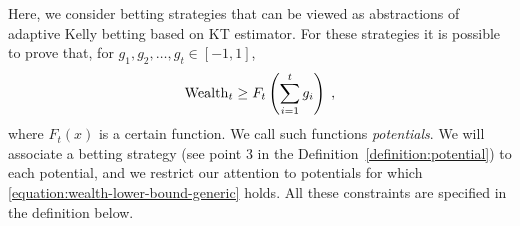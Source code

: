 Here, we consider betting strategies that can be viewed as abstractions of
adaptive Kelly betting based on KT estimator. For these strategies it is
possible to prove that, for $g_1, g_2, \dots, g_t \in [-1,1]$,
\begin{equation}
\label{equation:wealth-lower-bound-generic}
\operatorname{Wealth}_t \ge F_t \left( \sum_{i=1}^t g_i \right) \; ,
\end{equation}
where $F_t(x)$ is a certain function. We call such functions \emph{potentials}.
We will associate a betting strategy (see point 3 in the Definition~\ref{definition:potential}) to each potential,
and we restrict our
attention to potentials for which \eqref{equation:wealth-lower-bound-generic}
holds. All these constraints are specified in the definition below.
